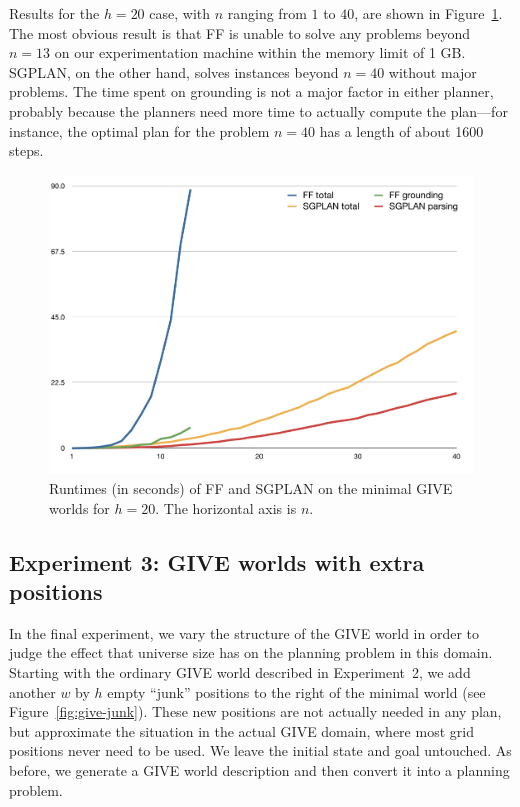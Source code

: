 Results for the $h=20$ case, with $n$ ranging from $1$ to $40$, are shown
in Figure~\ref{fig:give-runtime-minimal}.  The most obvious result is that
FF is unable to solve any problems beyond $n=13$ on our experimentation
machine within the memory limit of 1 GB.  SGPLAN, on the other hand, solves
instances beyond $n=40$ without major problems.  The time spent on
grounding is not a major factor in either planner, probably because the
planners need more time to actually compute the plan---for instance, the
optimal plan for the problem $n=40$ has a length of about 1600 steps.

\begin{figure}
  \centering
  \includegraphics[width=1\columnwidth]{pic-runtime-buttons}
  \caption{Runtimes (in seconds) of FF and SGPLAN on the minimal GIVE
    worlds for $h=20$. The horizontal axis is $n$.}
  \label{fig:give-runtime-minimal}
\end{figure}


\subsection{Experiment 3: GIVE worlds with extra positions}
\label{sec:experiment-3:-give}

In the final experiment, we vary the structure of the GIVE world in order
to judge the effect that universe size has on the planning problem in this
domain.  Starting with the ordinary GIVE world described in Experiment~2,
we add another $w$ by $h$ empty ``junk'' positions to the right of the
minimal world (see Figure~\ref{fig:give-junk}). These new positions are not
actually needed in any plan, but approximate the situation in the actual
GIVE domain, where most grid positions never need to be used. We leave the
initial state and goal untouched. As before, we generate a GIVE world
description and then convert it into a planning problem.

